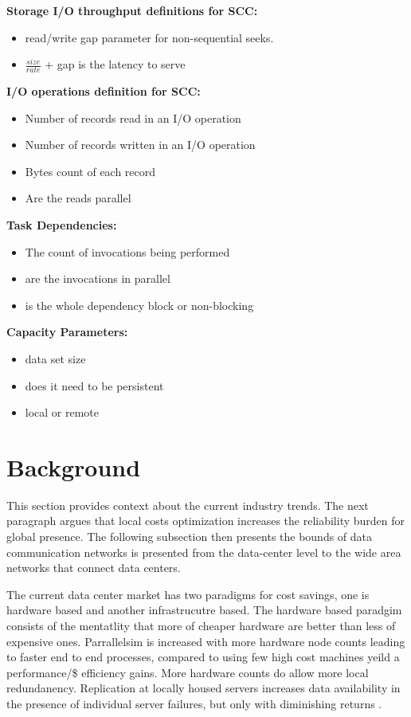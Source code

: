 \documentclass[conference]{IEEEtran}
\begin{document}
\textbf{Storage I/O throughput definitions for SCC:}
 \begin{itemize}
 \item read/write gap parameter for non-sequential seeks.
 \item $\frac{size}{rate}$ + gap is the latency to serve 
 \end{itemize}

\textbf{I/O operations definition for SCC:}
 \begin{itemize}
 \item Number of records read in an I/O operation
 \item Number of records written in an I/O operation
 \item Bytes count of each record
 \item Are the reads parallel
 \end{itemize}

\textbf{Task Dependencies:}
\begin{itemize}
\item The count of invocations being performed
\item are the invocations in parallel
\item is the whole dependency block or non-blocking
\end{itemize}

\textbf{Capacity Parameters:}
\begin{itemize}
\item data set size
\item does it need to be persistent
\item local or remote
\end{itemize}


\section{Background}
This section provides context about the current industry trends. The next paragraph argues that local costs optimization increases the reliability burden for global presence. The following subsection then presents the bounds of data communication networks is presented from the data-center level to the wide area networks that connect  data centers. 

The current data center market has two paradigms for cost savings, one is hardware based and another infrastrucutre based. The hardware based paradgim consists of the mentatlity that more of cheaper hardware are better than less of expensive ones. Parrallelsim is increased with more hardware node counts leading to faster end to end processes, compared to using few high cost machines yeild a performance/\$ efficiency gains. More hardware counts do allow more local redundanency. Replication at locally housed servers increases data availability in the presence of individual server failures, but only with diminishing returns \cite{megastore}. 
\end{document}
